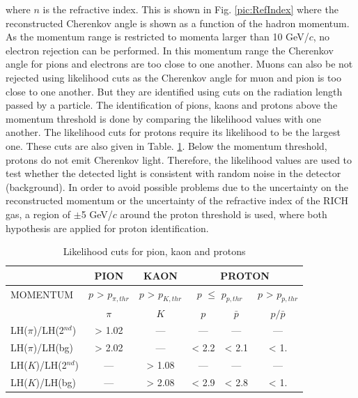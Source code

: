 where $n$ is the refractive index. This is shown in Fig. \ref{pic:RefIndex} where the reconstructed Cherenkov angle is shown as a function of the hadron momentum. As the momentum range is restricted to momenta larger than 10 GeV/$c$, no electron rejection can be performed. In this momentum range the Cherenkov angle for pions and electrons are too close to one another. Muons can also be not rejected using likelihood cuts as the Cherenkov angle for muon and pion is too close to one another. But they are identified using cuts on the radiation length passed by a particle. The identification of pions, kaons and protons above the momentum threshold is done by comparing the likelihood values with one another. The likelihood cuts for protons require its likelihood to be the largest one. These cuts are also given in Table. \ref{tab:LHcut}. Below the momentum threshold, protons do not emit Cherenkov light. Therefore, the likelihood values are used to test whether the detected light is consistent with random noise in the detector (background). In order to avoid possible problems due to the uncertainty on the reconstructed momentum or the uncertainty of the refractive index of the RICH gas, a region of $\pm$5 GeV/$c$ around the proton threshold is used, where both hypothesis are applied for proton identification.

\begin{table}[!h]
  \caption{Likelihood cuts for pion, kaon and protons}
  \label{tab:LHcut}
  \centering
  \begin{tabular}{lccccc}
    \hline
     & PION & KAON & \multicolumn{3}{c}{PROTON} \\
    \hline
    MOMENTUM & $p$ > $p_{\pi,thr}$ & $p$ > $p_{K,thr}$ & \multicolumn{2}{c}{$p$ $\leq$ $p_{p,thr}$} & $p$ > $p_{p,thr}$ \\
     & $\pi$ & $K$ & $p$ & $\bar{p}$ & $p/\bar{p}$ \\
    LH($\pi$)/LH(2$^{nd}$) & > 1.02 & --- & --- & --- & --- \\
    LH($\pi$)/LH(bg) & > 2.02 & --- & < 2.2 & < 2.1 & < 1.\\
    LH($K$)/LH(2$^{nd}$) & --- & > 1.08 & --- & --- & --- \\
    LH($K$)/LH(bg) & --- & > 2.08 & < 2.9 & < 2.8 & < 1. \\
    \hline
  \end{tabular}
\end{table}

